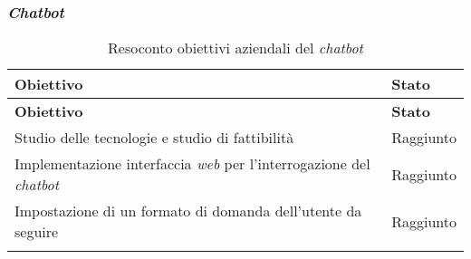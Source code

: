 \subsubsection{\textit{Chatbot}}
\renewcommand{\arraystretch}{2}
\begin{longtable}{|p{9cm}|p{2cm}|}
    \hline
    \rowcolor{tableheader}\textbf{Obiettivo} & \textbf{Stato} \\
    \hline
    \endfirsthead

    \rowcolor{tableheader}\textbf{Obiettivo} & \textbf{Stato}\\
    \hline
    \endhead

    \hline
    \endfoot

    \hline
    \endlastfoot

    \rowcolor{tableoddrow} Studio delle tecnologie e studio di fattibilità & Raggiunto \\
    \hline
    \rowcolor{tableevenrow} Implementazione interfaccia \textit{web} per l'interrogazione del \textit{chatbot} & Raggiunto \\
    \hline
    \rowcolor{tableoddrow} Impostazione di un formato di domanda dell'utente da seguire & Raggiunto \\
    \hline
    \caption{Resoconto obiettivi aziendali del \textit{chatbot}}
    \label{tab:resocontoobiettiviChatbot}
\end{longtable}


